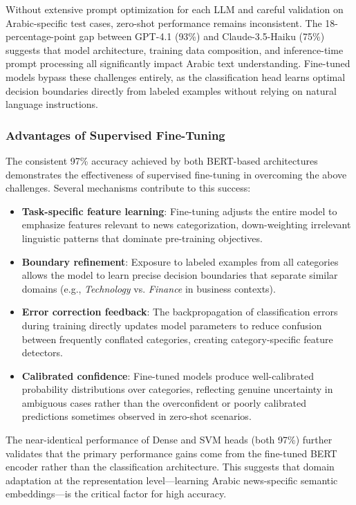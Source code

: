 \documentclass[preprint,12pt,authoryear]{elsarticle}
\begin{document}
Without extensive prompt optimization for each LLM and careful validation on Arabic-specific test cases, zero-shot performance remains inconsistent. The 18-percentage-point gap between GPT-4.1 (93\%) and Claude-3.5-Haiku (75\%) suggests that model architecture, training data composition, and inference-time prompt processing all significantly impact Arabic text understanding. Fine-tuned models bypass these challenges entirely, as the classification head learns optimal decision boundaries directly from labeled examples without relying on natural language instructions.

\subsubsection{Advantages of Supervised Fine-Tuning}

The consistent 97\% accuracy achieved by both BERT-based architectures demonstrates the effectiveness of supervised fine-tuning in overcoming the above challenges. Several mechanisms contribute to this success:

\begin{itemize}
    \item \textbf{Task-specific feature learning}: Fine-tuning adjusts the entire model to emphasize features relevant to news categorization, down-weighting irrelevant linguistic patterns that dominate pre-training objectives.
    
    \item \textbf{Boundary refinement}: Exposure to labeled examples from all categories allows the model to learn precise decision boundaries that separate similar domains (e.g., \textit{Technology} vs. \textit{Finance} in business contexts).
    
    \item \textbf{Error correction feedback}: The backpropagation of classification errors during training directly updates model parameters to reduce confusion between frequently conflated categories, creating category-specific feature detectors.
    
    \item \textbf{Calibrated confidence}: Fine-tuned models produce well-calibrated probability distributions over categories, reflecting genuine uncertainty in ambiguous cases rather than the overconfident or poorly calibrated predictions sometimes observed in zero-shot scenarios.
\end{itemize}

The near-identical performance of Dense and SVM heads (both 97\%) further validates that the primary performance gains come from the fine-tuned BERT encoder rather than the classification architecture. This suggests that domain adaptation at the representation level---learning Arabic news-specific semantic embeddings---is the critical factor for high accuracy.
\end{document}
